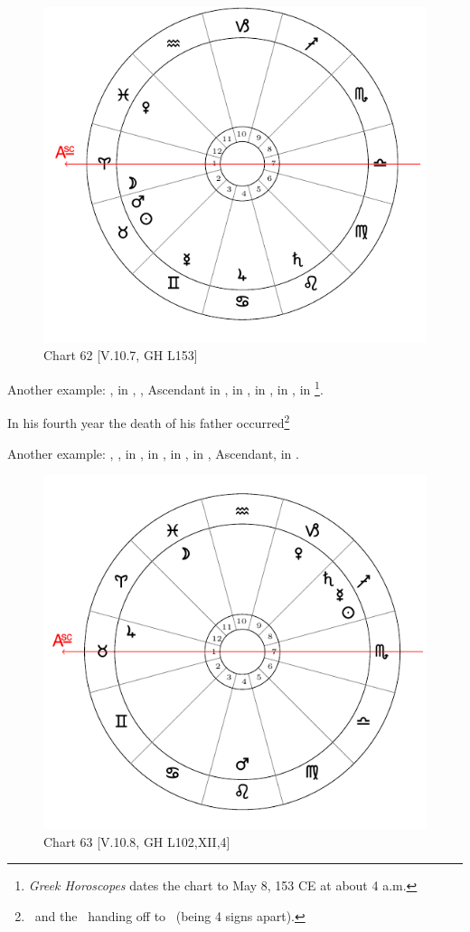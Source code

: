 \newpage
\begin{figure}
\centering
\includegraphics[width=.68\textwidth]{charts/5_10_07}
\caption{Chart 62 [V.10.7, GH L153]}
\label{fig:chart62}
\end{figure}

\noindent Another example: \Sun, \Mars\xspace in \Taurus, \Moon, Ascendant in \Aries, \Saturn\xspace in \Leo, \Jupiter\xspace in \Cancer, \Venus\xspace in \Pisces, \Mercury\xspace in \Gemini\footnote{\textit{Greek Horoscopes} dates the chart to May 8, 153 CE at about 4 a.m.}. 

In his fourth year the death of his father occurred\footnote{\Mars\, and the \Sun\, handing off to \Saturn\, (being 4 signs apart).}

\newpage
\noindent Another example: \Sun, \Mercury, \Saturn\xspace in \Sagittarius, \Moon in \Pisces, \Mars\xspace in \Leo, \Venus\xspace in \Capricorn, Ascendant, \Jupiter\xspace in \Taurus. 

\begin{figure}
\centering
\vspace{-20pt}
\includegraphics[width=.68\textwidth]{charts/5_10_08}
\caption{Chart 63 [V.10.8, GH L102,XII,4]}
\label{fig:chart63}
\end{figure}

